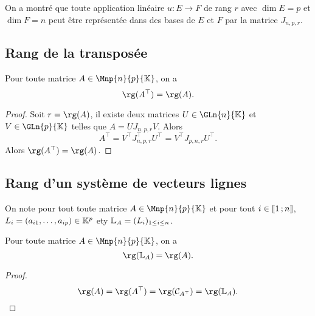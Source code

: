  On a montré que toute application linéaire $u: E \rightarrow F$ de rang $r$ avec $\dim E=p$ et $\dim F=n$ peut être représentée dans des bases de $E$ et $F$ par la matrice $J_{n,p,r}$.

\subsection{Rang de la transposée}

\begin{theo}
  Pour toute matrice $A \in \Mnp{n}{p}{\K}$, on a
  \begin{equation}
    \rg(A^\top)=\rg(A).
  \end{equation}
\end{theo}
\begin{proof}
  Soit $r=\rg(A)$, il existe deux matrices $U \in \GLn{n}{\K}$ et $V \in \GLn{p}{\K}$ telles que $A=U J_{n,p,r} V$. Alors 
  \begin{equation}
    A^\top = V^\top J_{n,p,r}^\top U^\top = V^\top J_{p,n,r} U^\top.
  \end{equation}
  Alors $\rg(A^\top)=\rg(A)$.
\end{proof}

\subsection{Rang d'un système de vecteurs lignes}

On note pour tout toute matrice $A \in \Mnp{n}{p}{\K}$ et pour tout $i \in \mathopen{\llbracket}1\mathclose{}\mathpunct{};n\mathclose{\rrbracket}$, $L_i=(a_{i1}, \ldots, a_{ip}) \in \mathbb{K}^p$ ety $\mathbb{L}_A=(L_i)_{1\leq i \leq n}$.
\begin{prop}
  Pour toute matrice $A \in \Mnp{n}{p}{\K}$, on a
  \begin{equation}
    \rg(\L_A)=\rg(A).
  \end{equation}
\end{prop}
\begin{proof}
  \begin{equation}
    \rg(A)=\rg(A^\top)=\rg(\courbe_{A^\top})=\rg(\L_A).
  \end{equation}
\end{proof}
